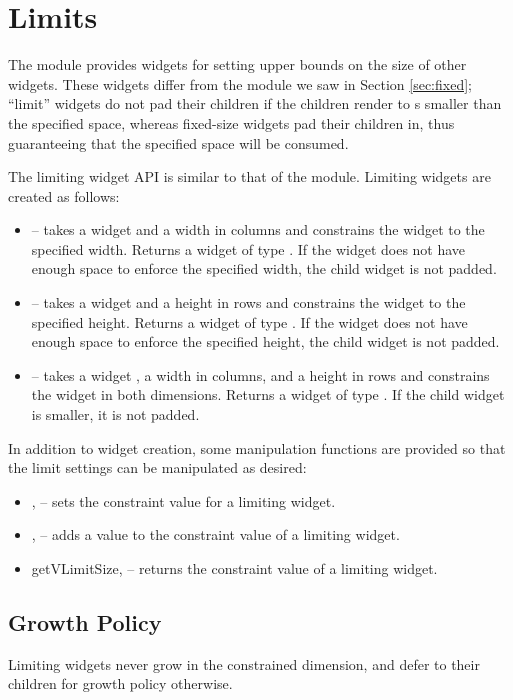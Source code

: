 \section{Limits}
\label{sec:limits}

The  module provides widgets for setting upper bounds on
the size of other widgets.  These widgets differ from the 
module we saw in Section \ref{sec:fixed}; ``limit'' widgets do not pad
their children if the children render to s smaller than the
specified space, whereas fixed-size widgets pad their children in,
thus guaranteeing that the specified space will be consumed.

The limiting widget API is similar to that of the  module.
Limiting widgets are created as follows:

\begin{itemize}
\item {} -- takes a widget  and a width in
  columns and constrains the widget to the specified width.  Returns a
  widget of type .  If the  widget
  does not have enough space to enforce the specified width, the child
  widget is not padded.
\item {} -- takes a widget  and a height in rows
  and constrains the widget to the specified height.  Returns a widget
  of type .  If the  widget does not
  have enough space to enforce the specified height, the child widget
  is not padded.
\item {} -- takes a widget , a width in
  columns, and a height in rows and constrains the widget in both
  dimensions.  Returns a widget of type .  If the child widget is smaller, it is not padded.
\end{itemize}

In addition to widget creation, some manipulation functions are
provided so that the limit settings can be manipulated as desired:

\begin{itemize}
\item {},  -- sets the constraint value for
  a limiting widget.
\item {},  -- adds a value to the
  constraint value of a limiting widget.
\item {getVLimitSize},  -- returns the constraint
  value of a limiting widget.
\end{itemize}

\subsection{Growth Policy}

Limiting widgets never grow in the constrained dimension, and defer to
their children for growth policy otherwise.

